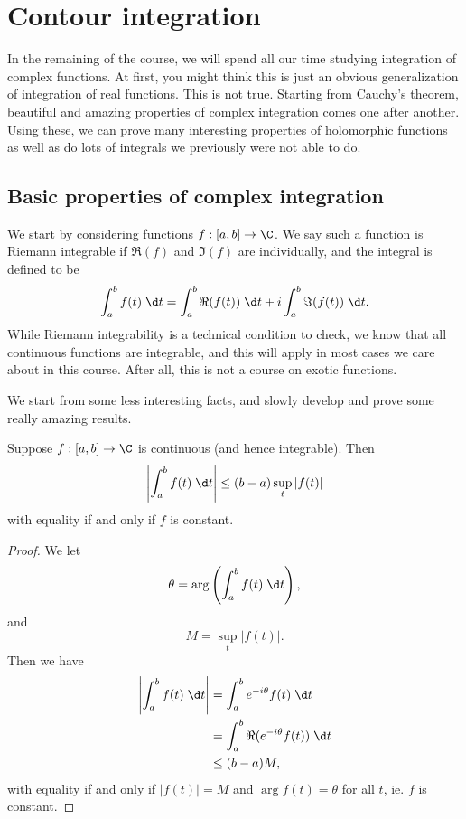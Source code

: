 \documentclass[a4paper]{article}
\begin{document}
\section{Contour integration}
In the remaining of the course, we will spend all our time studying integration of complex functions. At first, you might think this is just an obvious generalization of integration of real functions. This is not true. Starting from Cauchy's theorem, beautiful and amazing properties of complex integration comes one after another. Using these, we can prove many interesting properties of holomorphic functions as well as do lots of integrals we previously were not able to do.

\subsection{Basic properties of complex integration}
We start by considering functions $f: [a, b] \to \C$. We say such a function is Riemann integrable if $\Re(f)$ and $\Im (f)$ are individually, and the integral is defined to be
\[
  \int_a^b f(t) \;\d t = \int_a^b \Re(f(t))\;\d t + i \int_a^b \Im(f(t))\;\d t.
\]
While Riemann integrability is a technical condition to check, we know that all continuous functions are integrable, and this will apply in most cases we care about in this course. After all, this is not a course on exotic functions.

We start from some less interesting facts, and slowly develop and prove some really amazing results.
\begin{lemma}
  Suppose $f: [a, b] \to \C$ is continuous (and hence integrable). Then
  \[
    \left|\int_a^b f(t)\;\d t\right| \leq (b - a) \sup_t |f(t)|
  \]
  with equality if and only if $f$ is constant.
\end{lemma}

\begin{proof}
  We let
  \[
    \theta = \arg\left(\int_a^b f(t)\;\d t\right),
  \]
  and
  \[
    M = \sup_t |f(t)|.
  \]
  Then we have
  \begin{align*}
    \left|\int_a^b f(t)\;\d t\right| &= \int_a^b e^{-i\theta} f(t)\;\d t\\
    &= \int_a^b \Re(e^{-i\theta} f(t))\;\d t\\
    &\leq (b - a) M,
  \end{align*}
  with equality if and only if $|f(t)| =M$ and $\arg f(t) = \theta$ for all $t$, ie. $f$ is constant.
\end{proof}
\end{document}

